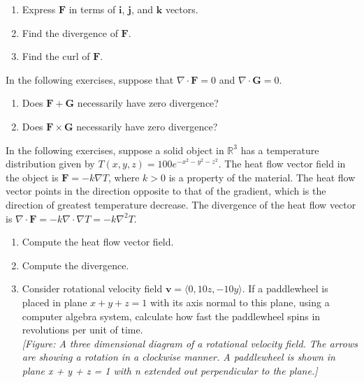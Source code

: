 \documentclass{exercises}
\begin{document}
\begin{enumerate}[resume]
\item Express $\mathbf{F}$ in terms of $\mathbf{i}$, $\mathbf{j}$, and $\mathbf{k}$ vectors.
\item Find the divergence of $\mathbf{F}$.
\item Find the curl of $\mathbf{F}$.
\end{enumerate}

In the following exercises, suppose that $\nabla \cdot \mathbf{F}=0$ and $\nabla \cdot \mathbf{G}=0$.

\begin{enumerate}[resume]
\item Does $\mathbf{F}+\mathbf{G}$ necessarily have zero divergence?
\item Does $\mathbf{F}\times \mathbf{G}$ necessarily have zero divergence?
\end{enumerate}

In the following exercises, suppose a solid object in $\mathbb{R}^{3}$ has a temperature distribution given by $T(x,y,z)=100e^{-x^{2}-y^{2}-z^{2}}$. The heat flow vector field in the object is $\mathbf{F}=-k\nabla T$, where $k>0$ is a property of the material. The heat flow vector points in the direction opposite to that of the gradient, which is the direction of greatest temperature decrease. The divergence of the heat flow vector is $\nabla \cdot \mathbf{F}=-k\nabla \cdot \nabla T=-k\nabla^{2}T$.

\begin{enumerate}[resume]
\item Compute the heat flow vector field.
\item Compute the divergence.
\item \techrequired Consider rotational velocity field $\mathbf{v}=\langle0,10z,-10y\rangle$. If a paddlewheel is placed in plane $x+y+z=1$ with its axis normal to this plane, using a computer algebra system, calculate how fast the paddlewheel spins in revolutions per unit of time. \\ \textit{[Figure: A three dimensional diagram of a rotational velocity field. The arrows are showing a rotation in a clockwise manner. A paddlewheel is shown in plane x + y + z = 1 with n extended out perpendicular to the plane.]}
\end{enumerate}
\end{document}
